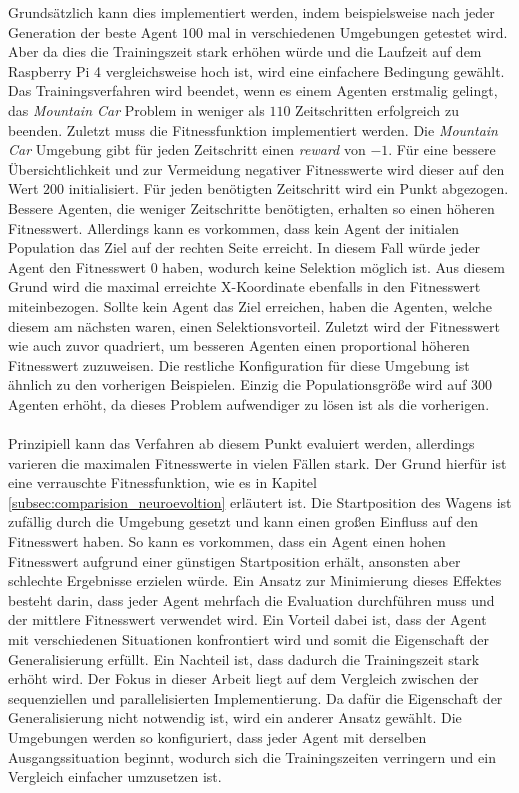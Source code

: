 Grundsätzlich kann dies implementiert werden, indem beispielsweise nach jeder Generation der beste Agent $100$ mal in verschiedenen Umgebungen getestet wird. Aber da dies die Trainingszeit stark erhöhen würde und die Laufzeit auf dem Raspberry Pi 4 vergleichsweise hoch ist, wird eine einfachere Bedingung gewählt. Das Trainingsverfahren wird beendet, wenn es einem Agenten erstmalig gelingt, das \emph{Mountain Car} Problem in weniger als $110$ Zeitschritten erfolgreich zu beenden. Zuletzt muss die Fitnessfunktion implementiert werden. Die \emph{Mountain Car} Umgebung gibt für jeden Zeitschritt einen \emph{reward} von $-1$. Für eine bessere Übersichtlichkeit und zur Vermeidung negativer Fitnesswerte wird dieser auf den Wert $200$ initialisiert. Für jeden benötigten Zeitschritt wird ein Punkt abgezogen. Bessere Agenten, die weniger Zeitschritte benötigten, erhalten so einen höheren Fitnesswert. Allerdings kann es vorkommen, dass kein Agent der initialen Population das Ziel auf der rechten Seite erreicht. In diesem Fall würde jeder Agent den Fitnesswert $0$ haben, wodurch keine Selektion möglich ist. Aus diesem Grund wird die maximal erreichte X-Koordinate ebenfalls in den Fitnesswert miteinbezogen. Sollte kein Agent das Ziel erreichen, haben die Agenten, welche diesem am nächsten waren, einen Selektionsvorteil. Zuletzt wird der Fitnesswert wie auch zuvor quadriert, um besseren Agenten einen proportional höheren Fitnesswert zuzuweisen. Die restliche Konfiguration für diese Umgebung ist ähnlich zu den vorherigen Beispielen. Einzig die Populationsgröße wird auf $300$ Agenten erhöht, da dieses Problem aufwendiger zu lösen ist als die vorherigen.
\\\\
Prinzipiell kann das Verfahren ab diesem Punkt evaluiert werden, allerdings varieren die maximalen Fitnesswerte in vielen Fällen stark. Der Grund hierfür ist eine verrauschte Fitnessfunktion, wie es in Kapitel \ref{subsec:comparision_neuroevoltion} erläutert ist. Die Startposition des Wagens ist zufällig durch die Umgebung gesetzt und kann einen großen Einfluss auf den Fitnesswert haben. So kann es vorkommen, dass ein Agent einen hohen Fitnesswert aufgrund einer günstigen Startposition erhält, ansonsten aber schlechte Ergebnisse erzielen würde. Ein Ansatz zur Minimierung dieses Effektes besteht darin, dass jeder Agent mehrfach die Evaluation durchführen muss und der mittlere Fitnesswert verwendet wird. Ein Vorteil dabei ist, dass der Agent mit verschiedenen Situationen konfrontiert wird und somit die Eigenschaft der Generalisierung erfüllt. Ein Nachteil ist, dass dadurch die Trainingszeit stark erhöht wird. Der Fokus in dieser Arbeit liegt auf dem Vergleich zwischen der sequenziellen und parallelisierten Implementierung. Da dafür die Eigenschaft der Generalisierung nicht notwendig ist, wird ein anderer Ansatz gewählt. Die Umgebungen werden so konfiguriert, dass jeder Agent mit derselben Ausgangssituation beginnt, wodurch sich die Trainingszeiten verringern und ein Vergleich einfacher umzusetzen ist.
